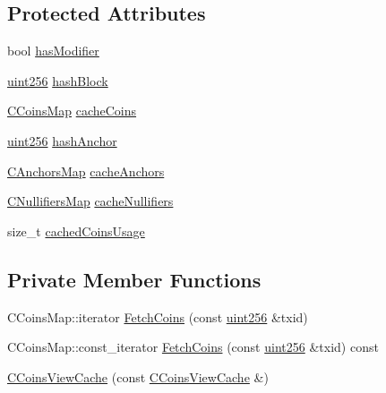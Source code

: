 \subsection*{Protected Attributes}
\begin{DoxyCompactItemize}
\item 
bool \mbox{\hyperlink{class_c_coins_view_cache_a363e27234d36bb0fc533d60cd64d1bc3}{has\+Modifier}}
\item 
\mbox{\hyperlink{classuint256}{uint256}} \mbox{\hyperlink{class_c_coins_view_cache_a229dddddbc5501edc250209a2ce5df8b}{hash\+Block}}
\item 
\mbox{\hyperlink{coins_8h_a2886ba2fd0428bae777e1cbcabc02834}{C\+Coins\+Map}} \mbox{\hyperlink{class_c_coins_view_cache_af33cc2c6d38af65ac833d4d13c8e3764}{cache\+Coins}}
\item 
\mbox{\hyperlink{classuint256}{uint256}} \mbox{\hyperlink{class_c_coins_view_cache_a72a4c55f52127b5e1b3e3a744a2b1cc3}{hash\+Anchor}}
\item 
\mbox{\hyperlink{coins_8h_a070827cc9d21a91b8f4f4f52a6f7c848}{C\+Anchors\+Map}} \mbox{\hyperlink{class_c_coins_view_cache_a45c975af9db57816d1e526af3f503a47}{cache\+Anchors}}
\item 
\mbox{\hyperlink{coins_8h_ab651cc287e9594190ef77d2fca2b14c7}{C\+Nullifiers\+Map}} \mbox{\hyperlink{class_c_coins_view_cache_a0d428d1dc56a4a069af0abe8956c9ed4}{cache\+Nullifiers}}
\item 
size\+\_\+t \mbox{\hyperlink{class_c_coins_view_cache_a980e94152512be71f2aa51e600132ef9}{cached\+Coins\+Usage}}
\end{DoxyCompactItemize}
\subsection*{Private Member Functions}
\begin{DoxyCompactItemize}
\item 
C\+Coins\+Map\+::iterator \mbox{\hyperlink{class_c_coins_view_cache_a7d385628b7d821d2d5b6c5aaf1734616}{Fetch\+Coins}} (const \mbox{\hyperlink{classuint256}{uint256}} \&txid)
\item 
C\+Coins\+Map\+::const\+\_\+iterator \mbox{\hyperlink{class_c_coins_view_cache_a964e8bc4a5f8131eab430d356a25fc6d}{Fetch\+Coins}} (const \mbox{\hyperlink{classuint256}{uint256}} \&txid) const
\item 
\mbox{\hyperlink{class_c_coins_view_cache_ae984d8a03ff13d03abf11874c227eaf1}{C\+Coins\+View\+Cache}} (const \mbox{\hyperlink{class_c_coins_view_cache}{C\+Coins\+View\+Cache}} \&)
\end{DoxyCompactItemize}
